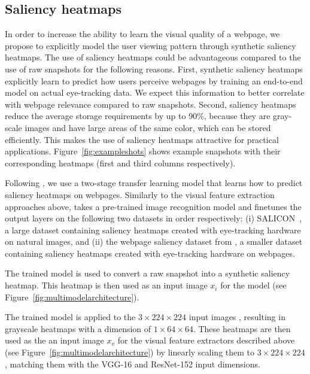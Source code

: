 \subsection{Saliency heatmaps} \label{sec:saliency}
In order to increase the ability to learn the visual quality of a webpage, we propose to explicitly model the user viewing pattern through synthetic saliency heatmaps.
The use of saliency heatmaps could be advantageous compared to the use of raw snapshots for the following reasons.
First, synthetic saliency heatmaps explicitly learn to predict how users perceive webpages by training an end-to-end model on actual eye-tracking data.
We expect this information to better correlate with webpage relevance compared to raw snapshots.
Second, saliency heatmaps reduce the average storage requirements by up to 90\%,
because they are gray-scale images and have large areas of the same color, which can be stored efficiently.
This makes the use of saliency heatmaps attractive for practical applications.
Figure~\ref{fig:exampleshots} shows example snapshots with their corresponding heatmaps (first and third columns respectively).

Following \cite{shan2017two}, we use a two-stage transfer learning model that learns how to predict saliency heatmaps on webpages.
Similarly to the visual feature extraction approaches above, \cite{shan2017two} takes a pre-trained image recognition model and finetunes the output layers on the following two datasets in order respectively:
(i) SALICON~\cite{jiang2015salicon}, a large dataset containing saliency heatmaps created with eye-tracking hardware on natural images, and 
(ii) the webpage saliency dataset from \cite{shen2014webpage}, a smaller dataset containing saliency heatmaps created with eye-tracking hardware on webpages.

The trained model is used to convert a raw snapshot into a synthetic saliency heatmap. This heatmap is then used as an input image $x_i$ for the \modelname{} model (see Figure~\ref{fig:multimodelarchitecture}).
%

The trained model is applied to the $3\times224\times224$ input images , resulting in grayscale heatmaps with a dimension of $1\times64\times64$.
These heatmaps are then used as the an input image $x_{v}$ for the visual feature extractors described above (see Figure~\ref{fig:multimodelarchitecture}) by linearly scaling them to $3\times224\times224$, matching them with the VGG-16 and ResNet-152 input dimensions.
\fi